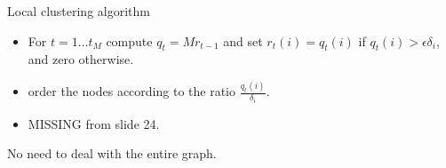 \documentclass[a4paper]{article}
\begin{document}

Local clustering algorithm
\begin{itemize}
	\item For $t=1\ldots t_M$ compute $q_t = M r_{t-1}$ and set
	$r_t(i) = q_t(i)$ if $q_t(i) > \epsilon \delta_i$, and zero otherwise.
	\item order the nodes according to the ratio $\frac{q_t(i)}{\delta_i}$.
	\item MISSING from slide 24.
\end{itemize}
No need to deal with the entire graph.




\end{document}
